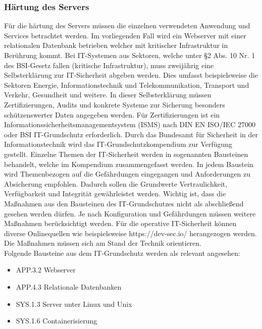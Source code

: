 \newpage
\subsubsection{H\"artung des Servers}

F\"ur die h\"artung des Servers m\"ussen die einzelnen verwendeten Anwendung und Services betrachtet werden. Im vorliegenden Fall wird ein Webserver mit einer relationalen Datenbank betrieben welcher mit kritischer Infrastruktur in Ber\"uhrung kommt. Bei IT-Systemen aus Sektoren, welche unter \S2 Abs. 10 Nr. 1 des BSI-Gesetz fallen (kritische Infrastruktur), muss zweij\"ahrig eine Selbsterkl\"arung zur IT-Sicherheit abgeben werden. Dies umfasst beispielsweise die Sektoren Energie, Informationstechnik und Telekommunikation, Transport und Verkehr, Gesundheit und weitere. In dieser Selbsterkl\"arung m\"ussen Zertifizierungen, Audits und konkrete Systeme zur Sicherung besonders sch\"utzenswerter Daten angegeben werden. F\"ur Zertifizierungen ist ein Informationssicherheitsmanagementsystem (ISMS) nach DIN EN ISO/IEC 27000 oder BSI IT-Grundschutz erforderlich. Durch das Bundesamt f\"ur Sicherheit in der Informationstechnik wird das IT-Grundschutzkompendium zur Verf\"ugung gestellt.  Einzelne Themen der IT-Sicherheit werden in sogenannten Bausteinen behandelt, welche im Kompendium zusammengefasst werden. In jedem Baustein wird Themenbezogen auf die Gef\"ahrdungen eingegangen und Anforderungen zu Absicherung empfohlen. Dadurch sollen die Grundwerte Vertraulichkeit, Verf\"ugbarkeit und Integrit\"at gew\"ahrleistet werden. Wichtig ist, dass die Ma{\ss}nahmen aus den Bausteinen des IT-Grundschutzes nicht als abschlie{\ss}end gesehen werden d\"urfen. Je nach Konfiguration und Gef\"ahrdungen m\"ussen weitere Ma{\ss}nahmen ber\"ucksichtigt werden. F\"ur die operative IT-Sicherheit k\"onnen diverse Onlinequellen wie beispielsweise https://dev-sec.io/ herangezogen werden. Die Ma{\ss}nahmen m\"ussen sich am Stand der Technik orientieren. \\

Folgende Bausteine aus dem IT-Grundschutz werden als relevant angesehen:
  \begin{itemize}
      \item APP.3.2 Webserver
			\item APP.4.3 Relationale Datenbanken
      \item SYS.1.3 Server unter Linux und Unix
			\item SYS.1.6 Containerisierung
   \end{itemize} 

